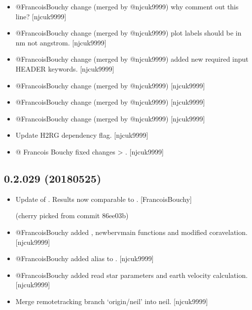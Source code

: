 \documentclass[a4paper,10pt,english]{report}
\begin{document}
\begin{itemize}
\begin{description}
\end{description}

\item {} 
@FrancoisBouchy change (merged by @njcuk9999) \sphinxhyphen{} why comment out this
line? {[}njcuk9999{]}

\item {} 
@FrancoisBouchy change (merged by @njcuk9999) \sphinxhyphen{} plot labels should be
in nm not angstrom. {[}njcuk9999{]}

\item {} 
@FrancoisBouchy change (merged by @njcuk9999) \sphinxhyphen{} added new required
input HEADER keywords. {[}njcuk9999{]}

\item {} 
@FrancoisBouchy change (merged by @njcuk9999) {[}njcuk9999{]}

\item {} 
@FrancoisBouchy change (merged by @njcuk9999) {[}njcuk9999{]}

\item {} 
@FrancoisBouchy change (merged by @njcuk9999) {[}njcuk9999{]}

\item {} 
Update H2RG dependency flag. {[}njcuk9999{]}

\item {} 
@ Francois Bouchy \sphinxhyphen{} fixed changes  \textendash{}\textgreater{} .
{[}njcuk9999{]}

\end{itemize}


\subsection{0.2.029 (2018\sphinxhyphen{}05\sphinxhyphen{}25)}
\label{\detokenize{misc/changelog:id450}}\begin{itemize}
\item {} 
Update of . Results now comparable to
. {[}FrancoisBouchy{]}

(cherry picked from commit 86ee03b)

\item {} 
@FrancoisBouchy added , newbervmain functions
and modified coravelation. {[}njcuk9999{]}

\item {} 
@FrancoisBouchy \sphinxhyphen{} added alias to .
{[}njcuk9999{]}

\item {} 
@FrancoisBouchy added read star parameters and earth velocity
calculation. {[}njcuk9999{]}

\item {} 
Merge remote\sphinxhyphen{}tracking branch ‘origin/neil’ into neil. {[}njcuk9999{]}

\end{itemize}
\end{document}
